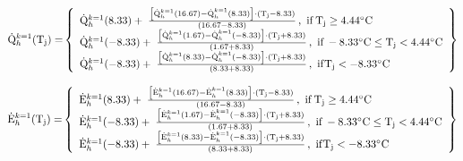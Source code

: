 \begin{equation}
{\rm{\dot Q}}_h^{k = 1}{\rm{(}}{{\rm{T}}_{\rm{j}}}{\rm{) = }}\left\{
    \begin{array}{l}
      {\rm{\dot Q}}_h^{k = 1}(8.33) + \;\frac{{\left[ {{\rm{\dot Q}}_h^{k = 1}{\rm{(16}}{\rm{.67) - \dot Q}}_h^{k = 1}{\rm{(8}}{\rm{.33)}}} \right] \cdot \left( {{{\rm{T}}_{\rm{j}}} - 8.33} \right)}}{{\left( {16.67 - 8.33} \right)}}\,{\rm{,~if }}\,{{\rm{T}}_{\rm{j}}} \ge 4.44{\rm{^\circ C}} \\
      {\rm{\dot Q}}_h^{k = 1}( - 8.33) + \;\frac{{\left[ {{\rm{\dot Q}}_h^{k = 1}{\rm{(1}}{\rm{.67) - \dot Q}}_h^{k = 1}{\rm{( - 8}}{\rm{.33)}}} \right] \cdot \left( {{{\rm{T}}_{\rm{j}}} + 8.33} \right)}}{{\left( {1.67 + 8.33} \right)}}\,{\rm{,~if }}\, - 8.33{\rm{^\circ C}} \le {{\rm{T}}_{\rm{j}}} < 4.44{\rm{^\circ C}} \\
      {\rm{\dot Q}}_h^{k = 1}( - 8.33) + \;\frac{{\left[ {{\rm{\dot Q}}_h^{k = 1}{\rm{(8}}{\rm{.33) - \dot Q}}_h^{k = 1}{\rm{( - 8}}{\rm{.33)}}} \right] \cdot \left( {{{\rm{T}}_{\rm{j}}} + 8.33} \right)}}{{\left( {8.33 + 8.33} \right)}}\,{\rm{,~if }}{{\rm{T}}_{\rm{j}}} <  - 8.33{\rm{^\circ C}}\,
    \end{array}
  \right\}
\end{equation}

\begin{equation}
{\rm{\dot E}}_h^{k = 1}{\rm{(}}{{\rm{T}}_{\rm{j}}}{\rm{) = }}\left\{
    \begin{array}{l}
      {\rm{\dot E}}_h^{k = 1}(8.33) + \;\frac{{\left[ {{\rm{\dot E}}_h^{k = 1}{\rm{(16}}{\rm{.67) - \dot E}}_h^{k = 1}{\rm{(8}}{\rm{.33)}}} \right] \cdot \left( {{{\rm{T}}_{\rm{j}}} - 8.33} \right)}}{{\left( {16.67 - 8.33} \right)}}\,{\rm{,~if }}\,{{\rm{T}}_{\rm{j}}} \ge 4.44{\rm{^\circ C}} \\
      {\rm{\dot E}}_h^{k = 1}( - 8.33) + \;\frac{{\left[ {{\rm{\dot E}}_h^{k = 1}{\rm{(1}}{\rm{.67) - \dot E}}_h^{k = 1}{\rm{( - 8}}{\rm{.33)}}} \right] \cdot \left( {{{\rm{T}}_{\rm{j}}} + 8.33} \right)}}{{\left( {1.67 + 8.33} \right)}}\,{\rm{,~if }}\, - 8.33{\rm{^\circ C}} \le {{\rm{T}}_{\rm{j}}} < 4.44{\rm{^\circ C}} \\
      {\rm{\dot E}}_h^{k = 1}( - 8.33) + \;\frac{{\left[ {{\rm{\dot E}}_h^{k = 1}{\rm{(8}}{\rm{.33) - \dot E}}_h^{k = 1}{\rm{( - 8}}{\rm{.33)}}} \right] \cdot \left( {{{\rm{T}}_{\rm{j}}} + 8.33} \right)}}{{\left( {8.33 + 8.33} \right)}}\,{\rm{,~if }}{{\rm{T}}_{\rm{j}}} <  - 8.33{\rm{^\circ C}}\,
    \end{array}
  \right\}
\end{equation}

